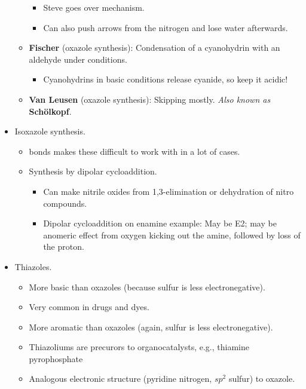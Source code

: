 \documentclass[../notes.tex]{subfiles}
\begin{document}
\begin{itemize}
\begin{itemize}
        \begin{itemize}
            \item Steve goes over mechanism.
            \item Can also push arrows from the nitrogen and lose water afterwards.
        \end{itemize}
        \item \textbf{Fischer} (oxazole synthesis): Condensation of a cyanohydrin with an aldehyde under  conditions.
        \begin{itemize}
            \item Cyanohydrins in basic conditions release cyanide, so keep it acidic!
        \end{itemize}
        \item \textbf{Van Leusen} (oxazole synthesis): Skipping mostly. \emph{Also known as} \textbf{Sch\"{o}lkopf}.
    \end{itemize}
    \item Isoxazole synthesis.
    \begin{itemize}
        \item {} bonds makes these difficult to work with in a lot of cases.
        \item Synthesis by dipolar cycloaddition.
        \begin{itemize}
            \item Can make nitrile oxides from 1,3-elimination or dehydration of nitro compounds.
            \item Dipolar cycloaddition on enamine example: May be E2; may be anomeric effect from oxygen kicking out the amine, followed by loss of the proton.
        \end{itemize}
    \end{itemize}
    \item Thiazoles.
    \begin{itemize}
        \item More basic than oxazoles (because sulfur is less electronegative).
        \item Very common in drugs and dyes.
        \item More aromatic than oxazoles (again, sulfur is less electronegative).
        \item Thiazoliums are precurors to organocatalysts, e.g., thiamine pyrophosphate
        \item Analogous electronic structure (pyridine nitrogen, $sp^2$ sulfur) to oxazole.
    \end{itemize}

\end{itemize}
\end{document}
